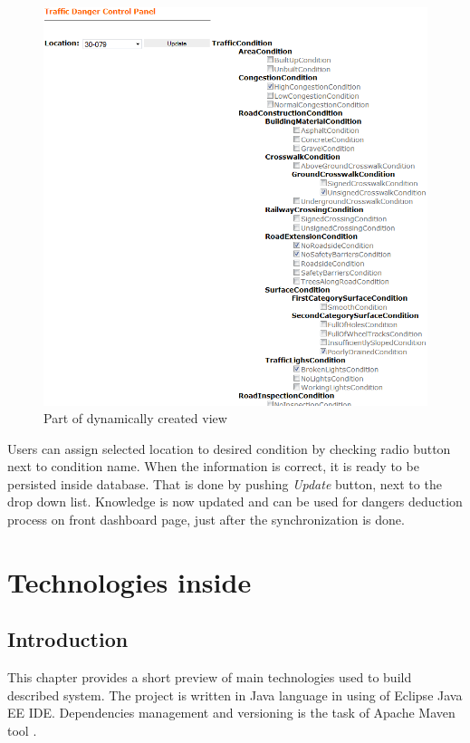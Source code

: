 \begin{figure}[htp]
\centering
\includegraphics[scale=0.55]{images/chapter4/PanelMain}
\caption{Part of dynamically created view}
\label{fig:panelMain}
\end{figure}

\noindent Users can assign selected location to desired condition by checking radio button next to condition name. When the information is correct, it is ready to be persisted inside database. That is done by pushing \textit{Update} button, next to the drop down list. Knowledge is now updated and can be used for dangers deduction process on front dashboard page, just after the synchronization is done.

\newpage

\section{Technologies inside}
\label{sec:technologiesInside}

\subsection{Introduction}
\label{sub:introductionToTechnologies}

This chapter provides a short preview of main technologies used to build described system. The project is written in Java language in using of Eclipse Java EE IDE. Dependencies management and versioning is the task of Apache Maven tool \cite{MavenHome}.

